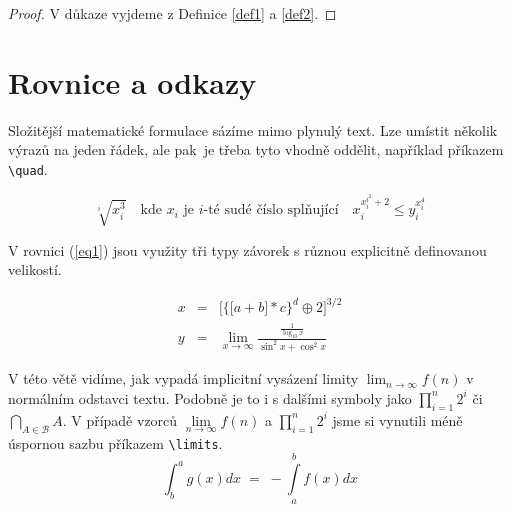 \documentclass[11pt]{article}
\theoremstyle{definition}
\begin{document}
    \begin{proof}
        V důkaze vyjdeme z Definice \ref{def1} a \ref{def2}. 
    \end{proof}
    
    \section{Rovnice a odkazy}
    \noindent
    Složitější matematické formulace sázíme mimo plynulý text. Lze umístit několik výrazů na jeden řádek, ale pak~je třeba tyto vhodně oddělit, například příkazem \texttt{\textbackslash quad}.
    
    
    \begin{equation*}
        \sqrt[i]{x_{i}^{3}} \quad \text{kde } x_{i} \text{ je } i \text{-té sudé číslo splňující} \quad x_{i}^{x_{i}^{i^{2}}+2} \leq y_{i}^{x_{i}^{4}}
    \end{equation*}
    
    V rovnici (\ref{eq1}) jsou využity tři typy závorek s různou explicitně definovanou velikostí.
    
    \begin{eqnarray} \label{eq1}
        x &= & \bigg[\Big\{\big[a + b\big] * c\Big\}^{d} \oplus 2\bigg]^{3 / 2}\\
        y &= & \lim_{x \to \infty} \frac{\frac{1}{\log_{10} x}}{\sin^{2}x + \cos^{2}x} \nonumber
    \end{eqnarray}
    
    V této větě vidíme, jak vypadá implicitní vysázení limity $\lim_{n \rightarrow \infty}f(n)$ v normálním odstavci textu. Podobně je to i s dalšími symboly jako $\prod^{n}_{i = 1} 2^{i}$ či $\bigcap_{A \in \mathcal{B}} A$. V případě vzorců $\lim\limits_{n \to \infty} f(n)$ a $\prod\limits _{i=1}^n 2^{i}$ jsme si vynutili méně úspornou sazbu příkazem \texttt{\textbackslash limits}.
    \begin{equation} \label{eq2}
        \int_{b}^{a} g(x)dx \; = \; - \int\limits_{a}^{b} f(x)dx
    \end{equation}
    
\end{document}
